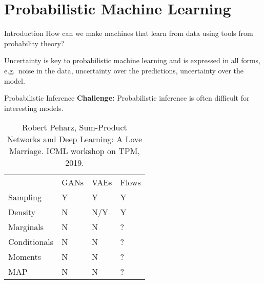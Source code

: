 \section{Probabilistic Machine Learning}

\begin{frame}{Introduction}
How can we make machines that learn from data using tools from probability theory?

Uncertainty is key to probabilistic machine learning and is expressed in all forms, e.g.~noise in the data, uncertainty over the predictions, uncertainty over the model.
\end{frame}



\begin{frame}{Probabilistic Inference}
\textbf{Challenge:} Probabilistic inference is often difficult for interesting models.

\begin{table}
\centering
\begin{tabular}{llll}
             & GANs & VAEs & Flows \\
Sampling     & Y    & Y    & Y          \\
Density      & N    & N/Y  & Y           \\
Marginals    & N    & N    & ?           \\
Conditionals & N    & N    & ?           \\
Moments      & N    & N    & ?           \\
MAP          & N    & N    & ?
\end{tabular}
\caption{\scriptsize Robert Peharz, Sum-Product Networks and Deep Learning: A Love Marriage. ICML workshop on TPM, 2019.}
\end{table}
\end{frame}
